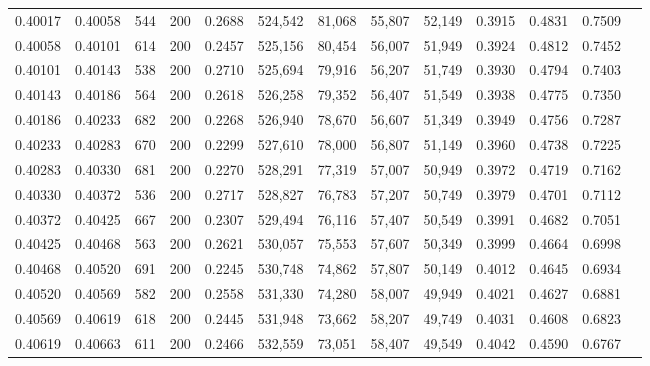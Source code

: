 \begin{tabular}{rrrrrrrrrrrrr}
0.40017 & 0.40058 &    544 & 200 &                                     0.2688 & 524,542 &  81,068 &  55,807 &  52,149 & 0.3915 & 0.4831 & 0.7509 \\
0.40058 & 0.40101 &    614 & 200 &                                     0.2457 & 525,156 &  80,454 &  56,007 &  51,949 & 0.3924 & 0.4812 & 0.7452 \\
0.40101 & 0.40143 &    538 & 200 &                                     0.2710 & 525,694 &  79,916 &  56,207 &  51,749 & 0.3930 & 0.4794 & 0.7403 \\
0.40143 & 0.40186 &    564 & 200 &                                     0.2618 & 526,258 &  79,352 &  56,407 &  51,549 & 0.3938 & 0.4775 & 0.7350 \\
0.40186 & 0.40233 &    682 & 200 &                                     0.2268 & 526,940 &  78,670 &  56,607 &  51,349 & 0.3949 & 0.4756 & 0.7287 \\
0.40233 & 0.40283 &    670 & 200 &                                     0.2299 & 527,610 &  78,000 &  56,807 &  51,149 & 0.3960 & 0.4738 & 0.7225 \\
0.40283 & 0.40330 &    681 & 200 &                                     0.2270 & 528,291 &  77,319 &  57,007 &  50,949 & 0.3972 & 0.4719 & 0.7162 \\
0.40330 & 0.40372 &    536 & 200 &                                     0.2717 & 528,827 &  76,783 &  57,207 &  50,749 & 0.3979 & 0.4701 & 0.7112 \\
0.40372 & 0.40425 &    667 & 200 &                                     0.2307 & 529,494 &  76,116 &  57,407 &  50,549 & 0.3991 & 0.4682 & 0.7051 \\
0.40425 & 0.40468 &    563 & 200 &                                     0.2621 & 530,057 &  75,553 &  57,607 &  50,349 & 0.3999 & 0.4664 & 0.6998 \\
0.40468 & 0.40520 &    691 & 200 &                                     0.2245 & 530,748 &  74,862 &  57,807 &  50,149 & 0.4012 & 0.4645 & 0.6934 \\
0.40520 & 0.40569 &    582 & 200 &                                     0.2558 & 531,330 &  74,280 &  58,007 &  49,949 & 0.4021 & 0.4627 & 0.6881 \\
0.40569 & 0.40619 &    618 & 200 &                                     0.2445 & 531,948 &  73,662 &  58,207 &  49,749 & 0.4031 & 0.4608 & 0.6823 \\
0.40619 & 0.40663 &    611 & 200 &                                     0.2466 & 532,559 &  73,051 &  58,407 &  49,549 & 0.4042 & 0.4590 & 0.6767 \\

\end{tabular}
